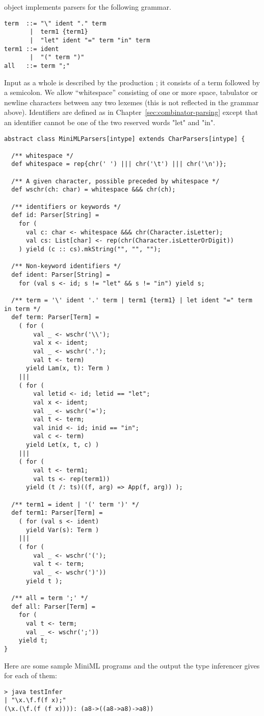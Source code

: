 \documentclass[a4paper,12pt,twoside,titlepage]{book}
\begin{document}
{object implements parsers for the following grammar.
\begin{lstlisting}
term  ::= "\" ident "." term
       |  term1 {term1}
       |  "let" ident "=" term "in" term
term1 ::= ident
       |  "(" term ")"
all   ::= term ";"
\end{lstlisting}
Input as a whole is described by the production ; it
consists of a term followed by a semicolon. We allow ``whitespace''
consisting of one or more space, tabulator or newline characters
between any two lexemes (this is not reflected in the grammar
above). Identifiers are defined as in
Chapter~\ref{sec:combinator-parsing} except that an identifier cannot
be one of the two reserved words "let" and "in".
\begin{lstlisting}
abstract class MiniMLParsers[intype] extends CharParsers[intype] {

  /** whitespace */
  def whitespace = rep{chr(' ') ||| chr('\t') ||| chr('\n')};

  /** A given character, possible preceded by whitespace */
  def wschr(ch: char) = whitespace &&& chr(ch);

  /** identifiers or keywords */
  def id: Parser[String] = 
    for (
      val c: char <- whitespace &&& chr(Character.isLetter); 
      val cs: List[char] <- rep(chr(Character.isLetterOrDigit))
    ) yield (c :: cs).mkString("", "", "");

  /** Non-keyword identifiers */
  def ident: Parser[String] =
    for (val s <- id; s != "let" && s != "in") yield s;

  /** term = '\' ident '.' term | term1 {term1} | let ident "=" term in term */
  def term: Parser[Term] =
    ( for (
        val _ <- wschr('\\');
        val x <- ident;
        val _ <- wschr('.');
        val t <- term)
      yield Lam(x, t): Term )
    |||
    ( for (
        val letid <- id; letid == "let"; 
        val x <- ident; 
        val _ <- wschr('='); 
        val t <- term; 
        val inid <- id; inid == "in"; 
        val c <- term)
      yield Let(x, t, c) )
    |||
    ( for (
        val t <- term1;
        val ts <- rep(term1))
      yield (t /: ts)((f, arg) => App(f, arg)) );

  /** term1 = ident | '(' term ')' */
  def term1: Parser[Term] = 
    ( for (val s <- ident)
      yield Var(s): Term )
    |||
    ( for (
        val _ <- wschr('(');
        val t <- term;
        val _ <- wschr(')'))
      yield t );

  /** all = term ';' */
  def all: Parser[Term] = 
    for (
      val t <- term;
      val _ <- wschr(';'))
    yield t;
}
\end{lstlisting}
Here are some sample MiniML programs and the output the type inferencer gives for each of them:
\begin{lstlisting}
> java testInfer
| "\x.\f.f(f x);"
(\x.(\f.(f (f x)))): (a8->((a8->a8)->a8))


\end{lstlisting}}
\end{document}
